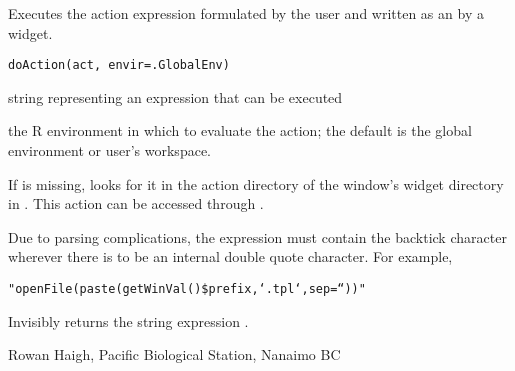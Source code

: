 \documentclass[letterpaper]{book}
\begin{document}
\begin{Description}\relax
Executes the action expression formulated by the user and 
written as an  by a widget.
\end{Description}
\begin{Usage}
\begin{verbatim}
doAction(act, envir=.GlobalEnv)
\end{verbatim}
\end{Usage}
\begin{Arguments}
\begin{ldescription}
\item[\code{act}] string representing an expression that can be executed
\item[\code{envir}] the R environment in which to evaluate the action; 
the default is the global environment or user's workspace. 
\end{ldescription}
\end{Arguments}
\begin{Details}\relax
If  is missing,  looks for it in the action
directory of the window's widget directory in . This 
action can be accessed through .

Due to parsing complications, the expression  must contain 
the backtick character  wherever there is to be an internal 
double quote  character. For example,
\begin{alltt}"openFile(paste(getWinVal()\$prefix,`.tpl`,sep=``))"\end{alltt}
\end{Details}
\begin{Value}
Invisibly returns the string expression .
\end{Value}
\begin{Author}\relax
Rowan Haigh, Pacific Biological Station, Nanaimo BC
\end{Author}
\end{document}
